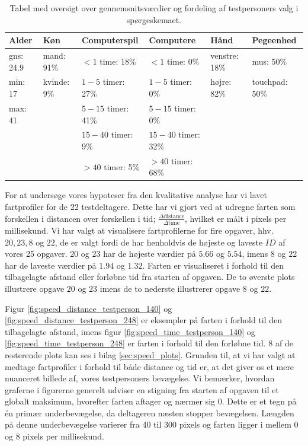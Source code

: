 \begin{table}[h]
	\centering
	\begin{tabular}{llllll}
		Alder            & Køn                  & Computerspil                & Computere                    & Hånd                   & Pegeenhed            \\\hline
		gns: \hfill24.9 & mand: \hfill91\%  & $<1$ time: \hfill18\%    & $<1$ time: \hfill0\%         & venstre: \hfill18\% & mus: \hfill50\%      \\
		min: \hfill17    & kvinde: \hfill9\% & $1-5$ timer: \hfill27\%  & $1-5$ timer: \hfill0\%       & højre: \hfill82\%   & touchpad: \hfill50\% \\
		max: \hfill41    &                      & $5-15$ timer: \hfill41\% & $5-15$ timer: \hfill0\%      &                        &                      \\
		                 &                      & $15-40$ timer: \hfill9\% & $15-40$ timer: \hfill32\% &                        &                      \\
		                 &                      & $>40$ timer: \hfill5\%   & $>40$ timer: \hfill68\%   &                        &
	\end{tabular}
	\caption{Tabel med oversigt over gennemsnitsværdier og fordeling af testpersoners valg i spørgeskemaet.}
	\label{tab:sample_persons_average}
\end{table}

For at undersøge vores hypoteser fra den kvalitative analyse har vi lavet fartprofiler for de 22 testdeltagere. Dette har vi gjort ved at udregne farten som forskellen i distancen over forskellen i tid; $\frac{\Delta \text{distance}}{\Delta \text{time}}$, hvilket er målt i pixels per millisekund. Vi har valgt at visualisere fartprofilerne for fire opgaver, hhv. $20,23,8$ og $22$, de er valgt fordi de har henholdvis de højeste og laveste $ID$ af vores 25 opgaver. $20$ og $23$ har de højeste værdier på $5.66$ og $5.54$, imens $8$ og $22$ har de laveste værdier på $1.94$ og $1.32$. Farten er visualiseret i forhold til den tilbagelagte afstand eller forløbne tid fra starten af opgaven. De to øverste plots illustrere opgave $20$ og $23$ imens de to nederste illustrerer opgave $8$ og $22$.

Figur \ref{fig:speed_distance_testperson_140} og \ref{fig:speed_distance_testperson_248} er eksempler på farten i forhold til den tilbagelagte afstand, imens figur \ref{fig:speed_time_testperson_140} og \ref{fig:speed_time_testperson_248} er farten i forhold til den forløbne tid. 8 af de resterende plots kan ses i bilag \ref{sec:speed_plots}. Grunden til, at vi har valgt at medtage fartprofiler i forhold til både distance og tid er, at det giver os et mere nuanceret billede af, vores testpersoners bevægelse. Vi bemærker, hvordan graferne i figurerne generelt udviser en stigning fra starten af opgaven til et globalt maksimum, hvorefter farten aftager og nærmer sig 0. Dette er et tegn på én primær underbevægelse, da deltageren næsten stopper bevægelsen. Længden på denne underbevægelse varierer fra 40 til 300 pixels og farten ligger i mellem 0 og 8 pixels per millisekund.

